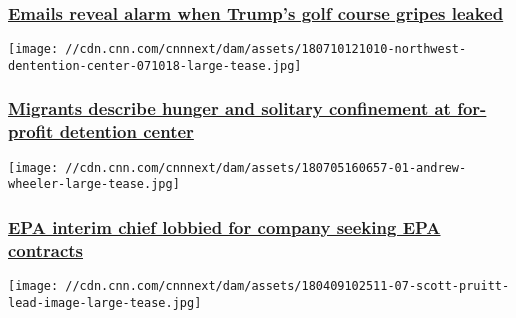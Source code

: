 \hypertarget{emails-reveal-alarm-when-trumps-golf-course-gripes-leaked}{%
\subsubsection{\texorpdfstring{\href{/2018/07/12/politics/donald-trump-british-operatives-windmills-emails/index.html}{Emails
reveal alarm when Trump's golf course gripes
leaked}}{Emails reveal alarm when Trump's golf course gripes leaked}}\label{emails-reveal-alarm-when-trumps-golf-course-gripes-leaked}}

\href{/2018/07/11/us/northwest-immigrant-detention-center-geo-group-invs/index.html}{}

\texttt{[image: //cdn.cnn.com/cnnnext/dam/assets/180710121010-northwest-dentention-center-071018-large-tease.jpg]}

\hypertarget{migrants-describe-hunger-and-solitary-confinement-at-for-profit-detention-center}{%
\subsubsection{\texorpdfstring{\href{/2018/07/11/us/northwest-immigrant-detention-center-geo-group-invs/index.html}{Migrants
describe hunger and solitary confinement at for-profit detention
center}}{Migrants describe hunger and solitary confinement at for-profit detention center}}\label{migrants-describe-hunger-and-solitary-confinement-at-for-profit-detention-center}}

\href{/2018/07/06/politics/epa-andrew-wheeler-contracts/index.html}{}

\texttt{[image: //cdn.cnn.com/cnnnext/dam/assets/180705160657-01-andrew-wheeler-large-tease.jpg]}

\hypertarget{epa-interim-chief-lobbied-for-company-seeking-epa-contracts-1}{%
\subsubsection{\texorpdfstring{\href{/2018/07/06/politics/epa-andrew-wheeler-contracts/index.html}{EPA
interim chief lobbied for company seeking EPA
contracts}}{EPA interim chief lobbied for company seeking EPA contracts}}\label{epa-interim-chief-lobbied-for-company-seeking-epa-contracts-1}}

\href{/2018/07/05/politics/pruitt-epa-beyer-lieu-inspector-general/index.html}{}

\texttt{[image: //cdn.cnn.com/cnnnext/dam/assets/180409102511-07-scott-pruitt-lead-image-large-tease.jpg]}

